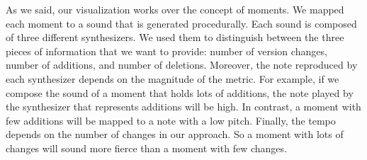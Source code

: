 As we said, our visualization works over the concept of moments. We mapped each moment to a sound that is generated procedurally. 
Each sound is composed of three different synthesizers. We used them to distinguish between the three pieces of information that we want to provide: number of version changes, number of additions, and number of deletions. Moreover, the note reproduced by each synthesizer depends on the magnitude of the metric. For example, if we compose the sound of a moment that holds lots of additions, the note played by the synthesizer that represents additions will be high. In contrast, a moment with few additions will be mapped to a note with a low pitch. Finally, the tempo depends on the number of changes in our approach. So a moment with lots of changes will sound more fierce than a moment with few changes. 













